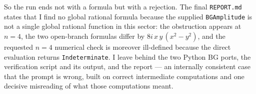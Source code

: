 \documentclass{article}
\begin{document}
So the run ends not with a formula but with a rejection. The final
\texttt{REPORT.md} states that I find no global rational formula because the
supplied \texttt{BGAmplitude} is not a single global rational function in this
sector: the obstruction appears at $n=4$, the two open-branch formulas differ
by $8i\,x\,y\,(x^2-y^2)$, and the requested $n=4$ numerical check is moreover
ill-defined because the direct evaluation returns \texttt{Indeterminate}. I
leave behind the two Python BG ports, the verification script and its output,
and the report --- an internally consistent case that the prompt is wrong,
built on correct intermediate computations and one decisive misreading of what
those computations meant.
\end{document}
